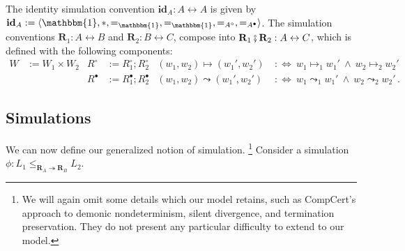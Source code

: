 \documentclass[acmsmall,screen,review,anonymous]{acmart}
\newcommand{\que}{\circ}
\newcommand{\ans}{\bullet}
\newcommand{\idsc}{\mathbf{id}} %
\newcommand{\vcomp}{\fatsemi}
\begin{document}
\begin{definition} \label{def:sccomp}
The identity simulation convention
$\idsc_A : A \leftrightarrow A$
is given by
$\idsc_A := \langle
    \mathbbm{1}, *, {=}_\mathbbm{1}, {=}_\mathbbm{1}, {=}_{A^\que}, {=}_{A^\ans}
 \rangle$.
The simulation conventions
$\mathbf{R}_1 : A \leftrightarrow B$ and
$\mathbf{R}_2 : B \leftrightarrow C$,
compose into
$\mathbf{R}_1 \vcomp \mathbf{R}_2 : A \leftrightarrow C$,
which is defined with the following components:
\begin{align*}
  W &:= W_1 \times W_2 &
  R^\que &:= R_1^\que \mathbin; R_2^\que &
  (w_1, w_2) \mapsto (w_1', w_2') \: &:\Leftrightarrow \:
    w_1 \mapsto_1 w_1' \: \wedge \:
    w_2 \mapsto_2 w_2' \\
&&  R^\ans &:= R_1^\ans \mathbin; R_2^\ans &
  (w_1, w_2) \leadsto (w_1', w_2') \: &:\Leftrightarrow \:
    w_1 \leadsto_1 w_1' \: \wedge \:
    w_2 \leadsto_2 w_2'
  \,.
\end{align*}
\end{definition}


\subsection{Simulations} \label{sec:base:sim} %

We can now define our generalized notion of simulation.%
\footnote{
  We will again omit some details
  which our model retains,
  such as CompCert's approach to
  demonic nondeterminism,
  silent divergence,
  and termination preservation.
  They do not present any particular difficulty
  to extend to our model.
}
Consider a simulation
$
  \phi : L_1 \le_{\mathbf{R}_A \twoheadrightarrow \mathbf{R}_B} L_2
$.
\end{document}
